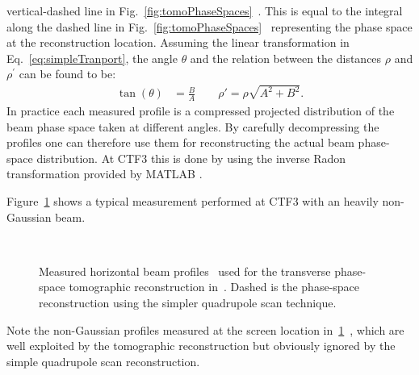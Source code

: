 vertical-dashed line in
Fig.~\ref{fig:tomoPhaseSpaces}~\protect{}.
This is equal to the integral along the dashed line in
Fig.~\ref{fig:tomoPhaseSpaces}~\protect{}
representing the phase space at the reconstruction location. 
Assuming the linear transformation in Eq.~\ref{eq:simpleTranport}, the angle
$\theta$ and the relation between the distances $\rho$ and $\rho^{\prime}$
can be found to be:
%
\begin{align}
 \tan(\theta) &= \frac{B}{A} \qquad
 \rho' = \rho \sqrt{A^2 + B^2}.
\label{eq:tomographyRelations}
\end{align}
In practice each measured profile is a compressed projected distribution of
the beam phase space taken at different angles.
By carefully decompressing the profiles one can therefore use them for
reconstructing the actual beam phase-space distribution.
At CTF3 this is done by using the inverse Radon transformation provided by
MATLAB \cite{mat:radon}. 

Figure~\ref{fig:tomo} shows a typical measurement performed at CTF3 with an
heavily non-Gaussian beam.
%
\begin{figure}[htb]
   \centering
    \\
   \caption{Measured horizontal beam profiles~\protect{} used for the transverse
            phase-space tomographic reconstruction in~\protect{}.
            Dashed is the phase-space reconstruction using the simpler quadrupole
            scan technique.}
   \label{fig:tomo}
\end{figure}
%
Note the non-Gaussian profiles measured at the screen location 
in~\ref{fig:tomo}~\protect{}, 
which are well exploited by the tomographic reconstruction but 
obviously ignored by the simple quadrupole scan reconstruction. 

